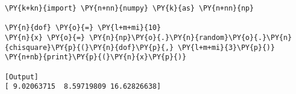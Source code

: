 \begin{Verbatim}[label=\makebox{\href{https://bitbucket.org/lbaldini/statnotes/src/master/snippets/np.random.chisquare.py}{https://bitbucket.org/.../np.random.chisquare.py}},commandchars=\\\{\}]
\PY{k+kn}{import} \PY{n+nn}{numpy} \PY{k}{as} \PY{n+nn}{np}

\PY{n}{dof} \PY{o}{=} \PY{l+m+mi}{10}
\PY{n}{x} \PY{o}{=} \PY{n}{np}\PY{o}{.}\PY{n}{random}\PY{o}{.}\PY{n}{chisquare}\PY{p}{(}\PY{n}{dof}\PY{p}{,} \PY{l+m+mi}{3}\PY{p}{)}
\PY{n+nb}{print}\PY{p}{(}\PY{n}{x}\PY{p}{)}

[Output]
[ 9.02063715  8.59719809 16.62826638]
\end{Verbatim}